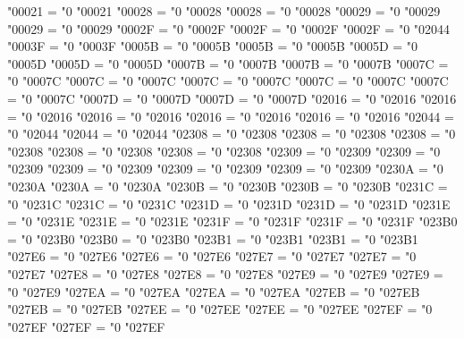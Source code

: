 \Udelcode  "00021 = "0 "00021
\Udelcode  "00028 = "0 "00028
\Udelcode  "00028 = "0 "00028
\Udelcode  "00029 = "0 "00029
\Udelcode  "00029 = "0 "00029
\Udelcode  "0002F = "0 "0002F
\Udelcode  "0002F = "0 "0002F
\Udelcode  "0002F = "0 "02044
\Udelcode  "0003F = "0 "0003F
\Udelcode  "0005B = "0 "0005B
\Udelcode  "0005B = "0 "0005B
\Udelcode  "0005D = "0 "0005D
\Udelcode  "0005D = "0 "0005D
\Udelcode  "0007B = "0 "0007B
\Udelcode  "0007B = "0 "0007B
\Udelcode  "0007C = "0 "0007C
\Udelcode  "0007C = "0 "0007C
\Udelcode  "0007C = "0 "0007C
\Udelcode  "0007C = "0 "0007C
\Udelcode  "0007C = "0 "0007C
\Udelcode  "0007D = "0 "0007D
\Udelcode  "0007D = "0 "0007D
\Udelcode  "02016 = "0 "02016
\Udelcode  "02016 = "0 "02016
\Udelcode  "02016 = "0 "02016
\Udelcode  "02016 = "0 "02016
\Udelcode  "02016 = "0 "02016
\Udelcode  "02044 = "0 "02044
\Udelcode  "02044 = "0 "02044
\Udelcode  "02308 = "0 "02308
\Udelcode  "02308 = "0 "02308
\Udelcode  "02308 = "0 "02308
\Udelcode  "02308 = "0 "02308
\Udelcode  "02308 = "0 "02308
\Udelcode  "02309 = "0 "02309
\Udelcode  "02309 = "0 "02309
\Udelcode  "02309 = "0 "02309
\Udelcode  "02309 = "0 "02309
\Udelcode  "02309 = "0 "02309
\Udelcode  "0230A = "0 "0230A
\Udelcode  "0230A = "0 "0230A
\Udelcode  "0230B = "0 "0230B
\Udelcode  "0230B = "0 "0230B
\Udelcode  "0231C = "0 "0231C
\Udelcode  "0231C = "0 "0231C
\Udelcode  "0231D = "0 "0231D
\Udelcode  "0231D = "0 "0231D
\Udelcode  "0231E = "0 "0231E
\Udelcode  "0231E = "0 "0231E
\Udelcode  "0231F = "0 "0231F
\Udelcode  "0231F = "0 "0231F
\Udelcode  "023B0 = "0 "023B0
\Udelcode  "023B0 = "0 "023B0
\Udelcode  "023B1 = "0 "023B1
\Udelcode  "023B1 = "0 "023B1
\Udelcode  "027E6 = "0 "027E6
\Udelcode  "027E6 = "0 "027E6
\Udelcode  "027E7 = "0 "027E7
\Udelcode  "027E7 = "0 "027E7
\Udelcode  "027E8 = "0 "027E8
\Udelcode  "027E8 = "0 "027E8
\Udelcode  "027E9 = "0 "027E9
\Udelcode  "027E9 = "0 "027E9
\Udelcode  "027EA = "0 "027EA
\Udelcode  "027EA = "0 "027EA
\Udelcode  "027EB = "0 "027EB
\Udelcode  "027EB = "0 "027EB
\Udelcode  "027EE = "0 "027EE
\Udelcode  "027EE = "0 "027EE
\Udelcode  "027EF = "0 "027EF
\Udelcode  "027EF = "0 "027EF


